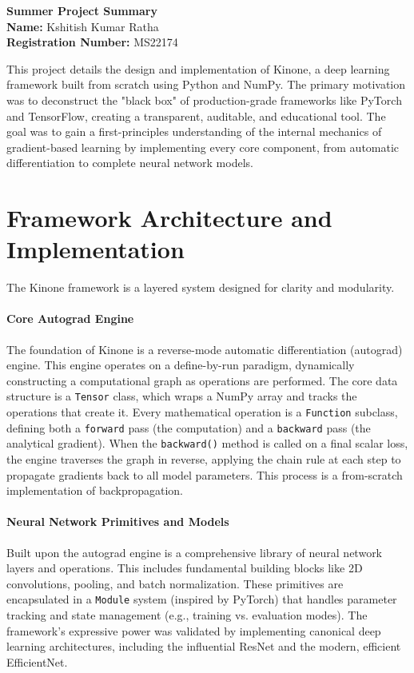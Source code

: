 \documentclass[a4paper]{article}
\begin{document}
\begin{center}
    \Large\textbf{Summer Project Summary} \\
    \vspace{4mm}
    \large\textbf{Name:} Kshitish Kumar Ratha \\
    \large\textbf{Registration Number:} MS22174
\end{center}

\vspace{6mm}

This project details the design and implementation of Kinone, a deep learning framework built from scratch using Python and NumPy. The primary motivation was to deconstruct the "black box" of production-grade frameworks like PyTorch and TensorFlow, creating a transparent, auditable, and educational tool. The goal was to gain a first-principles understanding of the internal mechanics of gradient-based learning by implementing every core component, from automatic differentiation to complete neural network models.

\section*{Framework Architecture and Implementation}

The Kinone framework is a layered system designed for clarity and modularity.

\paragraph{Core Autograd Engine}
The foundation of Kinone is a reverse-mode automatic differentiation (autograd) engine. This engine operates on a define-by-run paradigm, dynamically constructing a computational graph as operations are performed. The core data structure is a \texttt{Tensor} class, which wraps a NumPy array and tracks the operations that create it. Every mathematical operation is a \texttt{Function} subclass, defining both a \texttt{forward} pass (the computation) and a \texttt{backward} pass (the analytical gradient). When the \texttt{backward()} method is called on a final scalar loss, the engine traverses the graph in reverse, applying the chain rule at each step to propagate gradients back to all model parameters. This process is a from-scratch implementation of backpropagation.

\paragraph{Neural Network Primitives and Models}
Built upon the autograd engine is a comprehensive library of neural network layers and operations. This includes fundamental building blocks like 2D convolutions, pooling, and batch normalization. These primitives are encapsulated in a \texttt{Module} system (inspired by PyTorch) that handles parameter tracking and state management (e.g., training vs. evaluation modes). The framework's expressive power was validated by implementing canonical deep learning architectures, including the influential ResNet and the modern, efficient EfficientNet.
\end{document}

